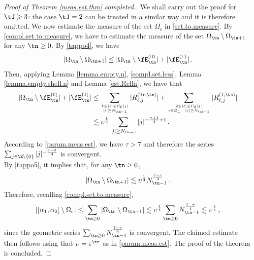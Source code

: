 \documentclass[a4paper,reqno,10pt]{article}
\begin{document}
\begin{proof}[Proof of Theorem \ref{meas.est.thm} completed.]
 We shall carry out the proof for $\tJ\geqslant 3$: the case $\tJ=2$ can be treated in a similar way and it is therefore omitted.  We now estimate the measure of the set $\Omega_{\varepsilon}$ in \eqref{set.to.measure}. By \eqref{compl.set.to.measure}, we have to estimate the measure of the set $\Omega_{\tn}\setminus\Omega_{\tn+1}$ for any $\tn\geq 0$. By \eqref{tappo4}, we have
    \begin{equation}\label{tappo5}
        |\Omega_{\tn}\setminus\Omega_{\tn+1}| \leq |\Omega_{\tn}\setminus \fE_{\tn}^{(0)}| + |\fE_{\tn}^{(1)}| \,.
    \end{equation}
    Then, applying Lemma \ref{lemma.empty.n}, \eqref{compl.set.less}, Lemma \ref{lemma.empty.shell.n} and Lemma \ref{est.Relln}, we have that
    \begin{align*}
    |\Omega_{\tn}\setminus \fE_{\tn}^{(0)}|+|\fE_{\tn}^{(1)}| & \leq  \sum_{1\leq |\ell|\leq C_{0}|j| \atop 
        |j|\geq N_{\tn-1}} |R_{\ell,j}^{({\rm Tr},\tn)}|+ \sum_{2\leq |\ell|\leq C_{0}|j| \atop 
       j\in\Z_\perp , \ |j|\geq N_{\tn-1}} |R_{\ell,j}^{(1,\tn)}| \\
        &\lesssim \upsilon^{\frac14} \sum_{|j|\geq N_{\tn-1}}  |j|^{-\frac{\tau+1}{4}+1}\,.
        \end{align*}        According to  \eqref{param.meas.est}, we have ${\tau>7}$   and therefore  the series   $ \sum_{j\in \Z\setminus\{0\}}  |j|^{-\frac{\tau-3}{4}}$ is  convergent.\\ By \eqref{tappo5}, it implies that, for any $\tn\geq 0$,
    \begin{equation}
     |\Omega_{\tn}\setminus\Omega_{\tn+1}| \lesssim \upsilon^{\frac14} N_{\tn-1}^{\frac{7-\tau}{4}} \,.
    \end{equation}
    Therefore, recalling \eqref{compl.set.to.measure}, 
    \begin{equation}
        |[\alpha_{1},\alpha_{2}]\setminus\Omega_{\varepsilon}| \leq \sum
        _{\tn\geq 0} |\Omega_{\tn}\setminus\Omega_{\tn+1}|  \lesssim \upsilon^{\frac14} \sum
        _{\tn\geq 0} N_{\tn-1}^{\frac{7-\tau}{4}} \lesssim \upsilon^{\frac14}\,,
    \end{equation}
    since the geometric series $\sum_{\tn\geq 0} N_{\tn-1}^{\frac{7-\tau}{4}}$ is convergent. The claimed estimate then follows using that $\upsilon=\varepsilon^{\tc}$ as in \eqref{param.meas.est}. The proof of the theorem is concluded.
 \end{proof}
\end{document}
